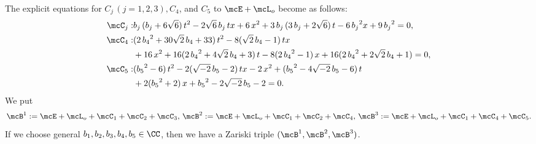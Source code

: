 \begin{exmple}[{\bf Combinatorics 2, 3-(b)}]
The explicit equations for $C_{j} \, (j = 1, 2, 3), C_{4}$, and $C_{5}$ to $\mcE + {\mcL}_{o}$ become as follows:
\begin{align*}
\mcC _{j} : & {b_{j}}\,({b_{j}} + 6 \sqrt{6})\, t^2 -2 \sqrt{6}\, {b_{j}}\, tx + 6\, x^2 + 3\, {b_{j}}\, (3\,{b_{j}}+2 \sqrt{6})\, t - 6\, {b_{j}}^2 x + 9\, {b_{j}}^2=0, \\
\mcC _{4} : & (2\, {b_{4}}^2 +  30 \sqrt{2}\, {b_{4}} + 33)\, t^2 - 8 ( \sqrt{2}\, {b_{4}} -1)\, tx \\
&+ 16\, x^2 + 16 ( 2\, {b_{4}}^2 + 4 \sqrt{2}\, {b_{4}} + 3 )\, t - 8 ( 2\, {b_{4}}^2 -1)\, x + 16 ( 2\, {b_{4}}^2 + 2 \sqrt{2}\, {b_{4}} + 1 )=0, \\
\mcC _{5} : & ( {b_{5}}^2 - 6 )\, t^2 - 2 ( \sqrt{-2}\, {b_{5}} -2)\, tx - 2\, x^2 + ( {b_{5}}^2 - 4 \sqrt{-2}\, {b_{5}} - 6 )\, t \\
&+ 2 ( {b_{5}}^2 +2)\, x + {b_{5}}^2 - 2 \sqrt{-2}\, {b_{5}} -2=0.
\end{align*}
We put
\[
{\mcB}^{1}:= {\mcE} + {\mcL}_{o} + {\mcC}_{1} + {\mcC}_{2} + {\mcC}_{3}, \,
{\mcB}^{2}:= {\mcE} + {\mcL}_{o} + {\mcC}_{1} + {\mcC}_{2} + {\mcC}_{4}, \,
{\mcB}^{3}:= {\mcE} + {\mcL}_{o} + {\mcC}_{1} + {\mcC}_{4} + {\mcC}_{5}.
\]
If we choose general $b_{1}, b_{2}, b_{3}, b_{4}, b_{5} \in \CC$, then we have a Zariski triple $({\mcB}^{1}, {\mcB}^{2}, {\mcB}^{3})$.
\end{exmple}

